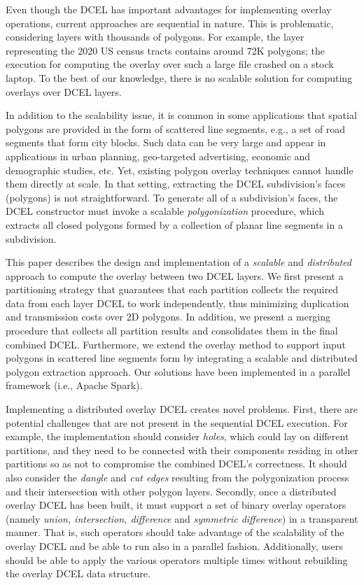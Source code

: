 Even though the DCEL has important advantages for implementing overlay operations, current approaches are sequential in nature. This is problematic, considering layers with thousands of polygons. For example, the layer representing the 2020 US census tracts contains around 72K polygons; the execution for computing the overlay over such a large file crashed on a stock laptop. To the best of our knowledge, there is no scalable solution for computing overlays over DCEL layers.


In addition to the scalability issue, it is common in some applications that spatial polygons are provided in the form of scattered line segments, e.g., a set of road segments that form city blocks.
Such data can be very large and appear in applications in urban planning, geo-targeted advertising, economic and demographic studies, etc.
Yet, existing polygon overlay techniques cannot handle them directly at scale.
In that setting, extracting the DCEL subdivision's faces (polygons) is not straightforward. 
To generate all of a subdivision's faces, the DCEL constructor must invoke a scalable \textit{polygonization} procedure, which extracts all closed polygons formed by a collection of planar line segments in a subdivision.


This paper describes the design and implementation of a \textit{scalable} and \textit{distributed} approach to compute the overlay between two DCEL layers. We first present a partitioning strategy that guarantees that each partition collects the required data from each layer DCEL to work independently, thus minimizing duplication and transmission costs over 2D polygons. In addition, we present a merging procedure that collects all partition results and consolidates them in the final combined DCEL.
Furthermore, we extend the overlay method to support input polygons in scattered line segments form by integrating a scalable and distributed polygon extraction approach.
Our solutions have been implemented in a parallel framework (i.e., Apache Spark).

Implementing a distributed overlay DCEL creates novel problems. First, there are potential challenges that are not present in the sequential DCEL execution. 
For example, the implementation should consider \textit{holes}, which could lay on different partitions, and they need to be connected with their components residing in other partitions so as not to compromise the combined DCEL's correctness.
It should also consider the \textit{dangle} and \textit{cut edges} resulting from the polygonization process and their intersection with other polygon layers.
Secondly, once a distributed overlay DCEL has been built, it must support a set of binary overlay operators (namely \textit{union, intersection, difference} and \textit{symmetric difference}) in a transparent manner.  That is, such operators should take advantage of the scalability of the overlay DCEL and be able to run also in a parallel fashion. Additionally, users should be able to apply the various operators multiple times without rebuilding the overlay DCEL data structure.  


